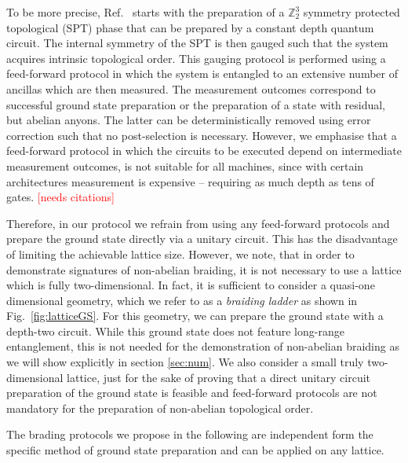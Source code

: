 \documentclass[two column]{article}
\newcommand{\caro}[1]{\textcolor{red}{[#1]}}
\begin{document}
To be more precise, Ref.~\cite{iqbal2023creation} starts with the preparation of a $\mathbb Z_2^3$ symmetry protected topological (SPT) phase that can be prepared by a constant depth quantum circuit. The internal symmetry of the SPT is then gauged such that the system acquires intrinsic topological order. This gauging protocol is performed using a feed-forward protocol in which the system is entangled to an extensive number of ancillas which are then measured. The measurement outcomes correspond to successful ground state preparation or the preparation of a state with residual, but abelian anyons. The latter can be deterministically removed using error correction such that no post-selection is necessary. However, we emphasise that a feed-forward protocol in which the circuits to be executed depend on intermediate measurement outcomes, is not suitable for all machines, since with certain architectures measurement is expensive -- requiring as much depth as tens of gates. \caro{needs citations} 

Therefore, in our protocol we refrain from using any feed-forward protocols and prepare the ground state directly via a unitary circuit. This has the disadvantage of limiting the achievable lattice size. However, we note, that in order to demonstrate signatures of non-abelian braiding, it is not necessary to use a lattice which is fully two-dimensional. In fact, it is sufficient to consider a quasi-one dimensional geometry, which we refer to as a \emph{braiding ladder} as shown in Fig.~\ref{fig:latticeGS}. For this geometry, we can prepare the ground state with a depth-two circuit. While this ground state does not feature long-range entanglement, this is not needed for the demonstration of non-abelian braiding as we will show explicitly in section \ref{sec:num}. We also consider a small truly two-dimensional lattice, just for the sake of proving that a direct unitary circuit preparation of the ground state is feasible and feed-forward protocols are not mandatory for the preparation of non-abelian topological order.

The brading protocols we propose in the following are independent form the specific method of ground state preparation and can be applied on any lattice.
\end{document}

